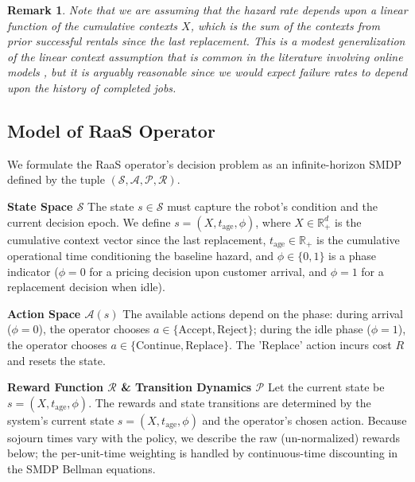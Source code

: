 \documentclass[letterpaper, 10 pt, conference]{IEEEconf}
\newtheorem{remark}{Remark}
\begin{document}
\begin{remark}
    Note that we are assuming that the hazard rate depends upon a linear function of the cumulative contexts $X$, which is the sum of the contexts from prior successful rentals since the last replacement. This is a modest generalization of the linear context assumption that is common in the literature involving online models \cite{agrawal2013thompson,dimakopoulou2019balanced,bastani2021mostly}, but it is arguably reasonable since we would expect failure rates to depend upon the history of completed jobs.
    \end{remark}

\subsection{Model of RaaS Operator}
\label{sec:mraas}



We formulate the RaaS operator's decision problem as an infinite-horizon SMDP defined by the tuple $(\mathcal{S}, \mathcal{A}, \mathcal{P}, \mathcal{R})$.

\textbf{State Space $\mathcal{S}$} The state $s \in \mathcal{S}$ must capture the robot's condition and the current decision epoch. We define $s = (X, t_{\text{age}}, \phi)$, where  $X \in \mathbb{R}_+^d$ is the cumulative context vector since the last replacement, $t_{\text{age}} \in \mathbb{R}_+$ is the cumulative operational time conditioning the baseline hazard, and $\phi \in \{0, 1\}$ is a phase indicator ($\phi=0$ for a pricing decision upon customer arrival, and $\phi=1$ for a replacement decision when idle).

\textbf{Action Space $\mathcal{A}(s)$} The available actions depend on the phase: during arrival ($\phi=0$), the operator chooses $a \in \{\text{Accept}, \text{Reject}\}$; during the idle phase ($\phi=1$), the operator chooses $a \in \{\text{Continue}, \text{Replace}\}$. The 'Replace' action incurs cost $R$ and resets the state.

\textbf{Reward Function $\mathcal{R}$ \& Transition Dynamics $\mathcal{P}$} Let the current state be $s=(X, t_{\text{age}}, \phi)$. The rewards and state transitions are determined by the system's current state $s=(X, t_{\text{age}}, \phi)$ and the operator's chosen action. Because sojourn times vary with the policy, we describe the raw (un-normalized) rewards below; the per-unit-time weighting is handled by continuous-time discounting in the SMDP Bellman equations.
\end{document}
